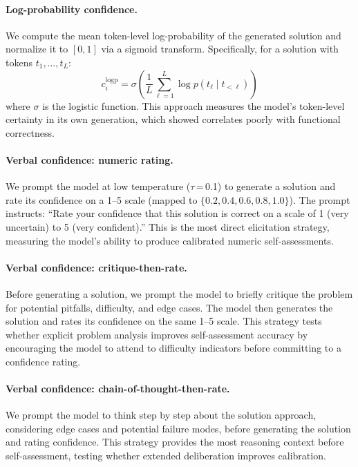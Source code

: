 \documentclass{article}
\begin{document}
\paragraph{Log-probability confidence.}
We compute the mean token-level log-probability of the generated solution and normalize it to $[0,1]$ via a sigmoid transform. Specifically, for a solution with tokens $t_1, \ldots, t_L$:
\begin{equation}
  c_i^{\text{logp}} = \sigma\!\left(\frac{1}{L}\sum_{\ell=1}^{L} \log p(t_\ell \mid t_{<\ell})\right)
  \label{eq:logprob}
\end{equation}
where $\sigma$ is the logistic function. This approach measures the model's token-level certainty in its own generation, which \citet{spiess2025calibration} showed correlates poorly with functional correctness.

\paragraph{Verbal confidence: numeric rating.}
We prompt the model at low temperature ($\tau$\,=\,0.1) to generate a solution and rate its confidence on a 1--5 scale (mapped to $\{0.2, 0.4, 0.6, 0.8, 1.0\}$). The prompt instructs: ``Rate your confidence that this solution is correct on a scale of 1 (very uncertain) to 5 (very confident).'' This is the most direct elicitation strategy, measuring the model's ability to produce calibrated numeric self-assessments.

\paragraph{Verbal confidence: critique-then-rate.}
Before generating a solution, we prompt the model to briefly critique the problem for potential pitfalls, difficulty, and edge cases. The model then generates the solution and rates its confidence on the same 1--5 scale. This strategy tests whether explicit problem analysis improves self-assessment accuracy by encouraging the model to attend to difficulty indicators before committing to a confidence rating.

\paragraph{Verbal confidence: chain-of-thought-then-rate.}
We prompt the model to think step by step about the solution approach, considering edge cases and potential failure modes, before generating the solution and rating confidence. This strategy provides the most reasoning context before self-assessment, testing whether extended deliberation improves calibration.
\end{document}
